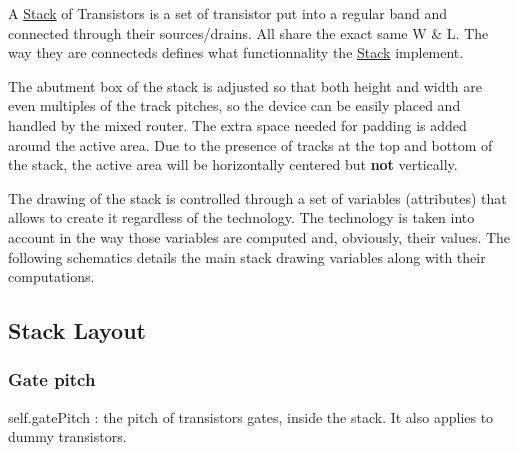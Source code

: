 A \hyperlink{classpython_1_1Stack_1_1Stack}{Stack} of Transistors is a set of transistor put into a regular band and connected through their sources/drains. All share the exact same W \& L. The way they are connecteds defines what functionnality the \hyperlink{classpython_1_1Stack_1_1Stack}{Stack} implement.

The abutment box of the stack is adjusted so that both height and width are even multiples of the track pitches, so the device can be easily placed and handled by the mixed router. The extra space needed for padding is added around the active area. Due to the presence of tracks at the top and bottom of the stack, the active area will be horizontally centered but {\bfseries not} vertically.

The drawing of the stack is controlled through a set of variables (attributes) that allows to create it regardless of the technology. The technology is taken into account in the way those variables are computed and, obviously, their values. The following schematics details the main stack drawing variables along with their computations.\hypertarget{classpython_1_1Stack_1_1Stack_secStackLayout}{}\subsection{Stack Layout}\label{classpython_1_1Stack_1_1Stack_secStackLayout}
\hypertarget{classpython_1_1Stack_1_1Stack_secGatePitch}{}\subsubsection{Gate pitch}\label{classpython_1_1Stack_1_1Stack_secGatePitch}

\begin{DoxyItemize}
\item {\ttfamily self.\-gate\-Pitch} \-: the pitch of transistors gates, inside the stack. It also applies to dummy transistors.
\end{DoxyItemize}

